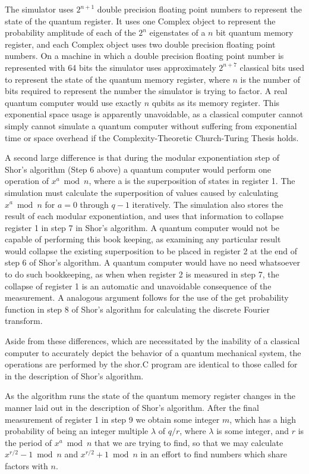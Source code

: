 \documentclass[]{article}
\begin{document}
The simulator uses $2^{n+1}$ double precision floating point numbers
to represent the state of the quantum register. It uses one Complex
object to represent the probability amplitude of each of the $2^{n}$
eigenstates of a $n$ bit quantum memory register, and each Complex
object uses two double precision floating point numbers. On a machine
in which a double precision floating point number is represented with
64 bits the simulator uses approximately $2^{n+7}$ classical bits used
to represent the state of the quantum memory register, where $n$ is
the number of bits required to represent the number the simulator is
trying to factor. A real quantum computer would use exactly $n$ qubits
as its memory register. This exponential space usage is apparently
unavoidable, as a classical computer cannot simply cannot simulate a
quantum computer without suffering from exponential time or space
overhead if the Complexity-Theoretic Church-Turing Thesis holds.

A second large difference is that during the modular exponentiation
step of Shor's algorithm (Step 6 above) a quantum computer would
perform one operation of $x^{a} \bmod n$, where a is the superposition
of states in register 1. The simulation must calculate the
superposition of values caused by calculating $x^{a} \bmod n$ for $a =
0$ through $q - 1$ iteratively. The simulation also stores the result
of each modular exponentiation, and uses that information to collapse
register 1 in step 7 in Shor's algorithm. A quantum computer would not
be capable of performing this book keeping, as examining any
particular result would collapse the existing superposition to be
placed in register 2 at the end of step 6 of Shor's algorithm. A
quantum computer would have no need whatsoever to do such bookkeeping,
as when when register 2 is measured in step 7, the collapse of
register 1 is an automatic and unavoidable consequence of the
measurement. A analogous argument follows for the use of the get
probability function in step 8 of Shor's algorithm for calculating the
discrete Fourier transform.

Aside from these differences, which are necessitated by the inability
of a classical computer to accurately depict the behavior of a quantum
mechanical system, the operations are performed by the shor.C
program are identical to those called for in the description of Shor's
algorithm.

As the algorithm runs the state of the quantum memory register changes
in the manner laid out in the description of Shor's algorithm.  After
the final measurement of register 1 in step 9 we obtain some integer
$m$, which has a high probability of being an integer multiple
$\lambda$ of $q / r$, where $\lambda$ is some integer, and $r$ is the
period of $x^{a} \bmod n$ that we are trying to find, so that we may
calculate $x^{r/2} - 1 \bmod n$ and $x^{r/2} + 1 \bmod n$ in an effort
to find numbers which share factors with $n$.
\end{document}
